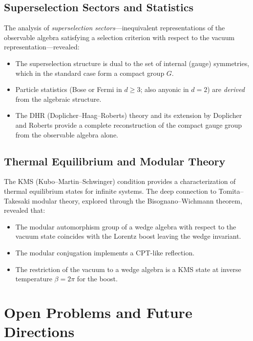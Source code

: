 \documentclass[11pt,a4paper]{article}
\begin{document}
\subsection{Superselection Sectors and Statistics}

The analysis of \emph{superselection sectors}---inequivalent representations
of the observable algebra satisfying a selection criterion with respect to
the vacuum representation---revealed:
\begin{itemize}[nosep]
  \item The superselection structure is dual to the set of internal (gauge)
        symmetries, which in the standard case form a compact group $G$.
  \item Particle statistics (Bose or Fermi in $d \geq 3$; also anyonic in $d = 2$)
        are \emph{derived} from the algebraic structure.
  \item The DHR (Doplicher--Haag--Roberts) theory and its extension by
        Doplicher and Roberts provide a complete reconstruction of the
        compact gauge group from the observable algebra alone.
\end{itemize}

\subsection{Thermal Equilibrium and Modular Theory}

The KMS (Kubo--Martin--Schwinger) condition provides a characterization
of thermal equilibrium states for infinite systems. The deep connection
to Tomita--Takesaki modular theory, explored through the
Bisognano--Wichmann theorem, revealed that:
\begin{itemize}[nosep]
  \item The modular automorphism group of a wedge algebra with respect to
        the vacuum state coincides with the Lorentz boost leaving the wedge
        invariant.
  \item The modular conjugation implements a CPT-like reflection.
  \item The restriction of the vacuum to a wedge algebra is a KMS state
        at inverse temperature $\beta = 2\pi$ for the boost.
\end{itemize}

\section{Open Problems and Future Directions}
\end{document}
